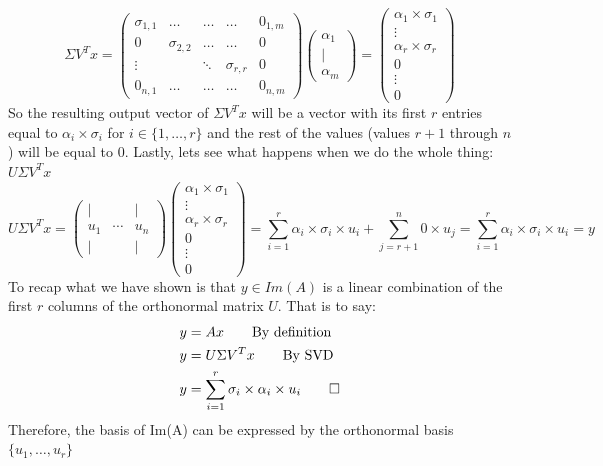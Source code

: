 \documentclass[12pt,twoside]{article}
\begin{document}
$$
    \Sigma V^Tx = \begin{pmatrix}
    \sigma_{1,1} & \dots & \dots & \dots & 0_{1,m}\\
    0 & \sigma_{2,2} & \dots & \dots & 0 \\
    \vdots & & \ddots & \sigma_{r,r} & 0\\
    0_{n,1} & \dots & \dots & \dots & 0_{n,m}
    \end{pmatrix} \begin{pmatrix}
			\alpha_1 \\
			| \\
			\alpha_m
			\end{pmatrix} = 
			\begin{pmatrix}
			\alpha_1 \times \sigma_1 \\
			\vdots \\
			\alpha_r \times \sigma_r \\
			0 \\
			\vdots \\
			0
			\end{pmatrix}
$$
So the resulting output vector of $\Sigma V^T x$ will be a vector with its first $r$ entries equal to $\alpha_i\times \sigma_i$ for $i \in \{1,\dots, r\}$ and the rest of the values (values $r+1$ through $n$) will be equal to 0.
Lastly, lets see what happens when we do the whole thing: $U\Sigma V^T x$
$$
U\Sigma V^T x = 
    \begin{pmatrix}
					| & & | \\
					u_1 & \!\cdots\! & u_n \\
					| & & | 
			\end{pmatrix}\begin{pmatrix}
			\alpha_1 \times \sigma_1 \\
			\vdots \\
			\alpha_r \times \sigma_r \\
			0 \\
			\vdots \\
			0
			\end{pmatrix} = \sum_{i=1}^r \alpha_i \times \sigma_i \times u_i + \sum_{j=r+1}^n 0 \times u_j = \sum_{i=1}^r \alpha_i \times \sigma_i \times u_i = y
$$
To recap what we have shown is that $y\in Im(A)$ is a linear combination of the first $r$ columns of the orthonormal matrix $U$. That is to say:
\begin{equation}
    \begin{split}
        y &= Ax \qquad \text{By definition} \\
        y &= U\Sigma V^Tx  \qquad \text{By SVD} \\
        y &= \sum_{i=1}^r \sigma_i \times \alpha_i \times u_i \qed
    \end{split}
\end{equation}
Therefore, the basis of Im(A) can be expressed by the orthonormal basis $\{u_1, \dots, u_r\}$\\
\end{document}
